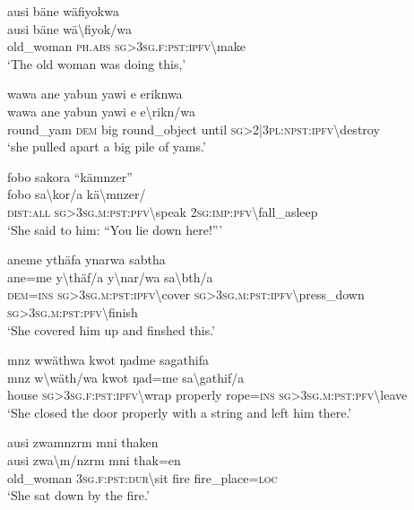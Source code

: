 \ea\label{ex:8:a1767}
ausi bäne wäfiyokwa\\
\gll ausi	bäne	wä{\textbackslash}fiyok/wa\\
     old\_woman	\textsc{ph}.\textsc{abs}	\textsc{sg}>3\textsc{sg}.\textsc{f}:\textsc{pst}:\textsc{ipfv}{\textbackslash}make\\
\glt `The old woman was doing this,'
\z

\ea\label{ex:8:a1769}
wawa ane yabun yawi e eriknwa\\
\gll wawa	ane	yabun	yawi	e	e{\textbackslash}rikn/wa\\
     round\_yam	\textsc{dem}	big	round\_object	until	\textsc{sg}>2|3\textsc{pl}:\textsc{npst}:\textsc{ipfv}{\textbackslash}destroy\\
\glt `she pulled apart a big pile of yams.'
\z

\ea\label{ex:8:a1771}
fobo sakora ``kämnzer''\\
\gll fobo	sa{\textbackslash}kor/a	kä{\textbackslash}mnzer/\\
     \textsc{dist}:\textsc{all}	\textsc{sg}>3\textsc{sg}.\textsc{m}:\textsc{pst}:\textsc{pfv}{\textbackslash}speak	2\textsc{sg}:\textsc{imp}:\textsc{pfv}{\textbackslash}fall\_asleep\\
\glt `She said to him: ``You lie down here!'''
\z

\ea\label{ex:8:a1772}
aneme ythäfa ynarwa sabtha\\
\gll ane=me	y{\textbackslash}thäf/a	y{\textbackslash}nar/wa	sa{\textbackslash}bth/a\\
     \textsc{dem}=\textsc{ins}	\textsc{sg}>3\textsc{sg}.\textsc{m}:\textsc{pst}:\textsc{ipfv}{\textbackslash}cover	\textsc{sg}>3\textsc{sg}.\textsc{m}:\textsc{pst}:\textsc{ipfv}{\textbackslash}press\_down	\textsc{sg}>3\textsc{sg}.\textsc{m}:\textsc{pst}:\textsc{pfv}{\textbackslash}finish\\
\glt `She covered him up and finshed this.'
\z

\ea\label{ex:8:a1774}
mnz wwäthwa kwot ŋadme sagathifa\\
\gll mnz	w{\textbackslash}wäth/wa	kwot	ŋad=me	sa{\textbackslash}gathif/a\\
     house	\textsc{sg}>3\textsc{sg}.\textsc{f}:\textsc{pst}:\textsc{ipfv}{\textbackslash}wrap	properly	rope=\textsc{ins}	\textsc{sg}>3\textsc{sg}.\textsc{m}:\textsc{pst}:\textsc{pfv}{\textbackslash}leave\\
\glt `She closed the door properly with a string and left him there.'
\z

\ea\label{ex:8:a1776}
ausi zwamnzrm mni thaken\\
\gll ausi	zwa{\textbackslash}m/nzrm	mni	thak=en\\
     old\_woman	3\textsc{sg}.\textsc{f}:\textsc{pst}:\textsc{dur}{\textbackslash}sit	fire	fire\_place=\textsc{loc}\\
\glt `She sat down by the fire.'
\z

